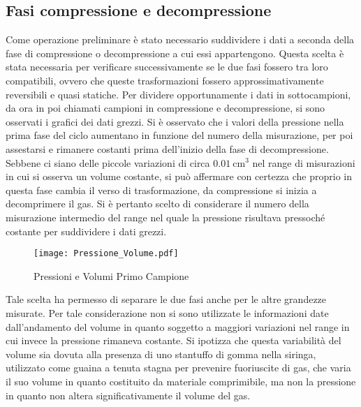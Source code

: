 \documentclass[a4paper,11pt,oneside]{article}
\begin{document}
\subsection{Fasi compressione e decompressione}\label{par:compress}
Come operazione preliminare è stato necessario suddividere i dati a seconda della fase di compressione o decompressione a cui essi appartengono. Questa scelta è stata necessaria per verificare successivamente se le due fasi fossero tra loro compatibili, ovvero che queste trasformazioni fossero approssimativamente reversibili e quasi statiche.
Per dividere opportunamente i dati in sottocampioni, da ora in poi chiamati campioni in compressione e decompressione, si sono osservati i grafici dei dati grezzi. Si è osservato che i valori della pressione nella prima fase del ciclo aumentano in funzione del numero della misurazione, per poi assestarsi e rimanere costanti prima dell'inizio della fase di decompressione. Sebbene ci siano delle piccole variazioni di circa $\SI{0.01}{\centi\meter\cubed}$ nel range di misurazioni in cui si osserva un volume costante, si può affermare con certezza che proprio in questa fase cambia il verso di trasformazione, da compressione si inizia a decomprimere il gas. Si è pertanto scelto di considerare il numero della misurazione intermedio del range nel quale la pressione risultava pressoché costante per suddividere i dati grezzi.
\begin{wrapfigure}{l}{0.5\textwidth}
  \begin{center}
    \texttt{[image: Pressione\_Volume.pdf]}
  \end{center}
  \caption{Pressioni e Volumi Primo Campione}
  \label{fig:campione2}
\end{wrapfigure}
Tale scelta ha permesso di separare le due fasi anche per le altre grandezze misurate. Per tale considerazione non si sono utilizzate le informazioni date dall'andamento del volume in quanto soggetto a maggiori variazioni nel range in cui invece la pressione rimaneva costante. Si ipotizza che questa variabilità del volume sia dovuta alla presenza di uno stantuffo di gomma nella siringa, utilizzato come guaina a tenuta stagna per prevenire fuoriuscite di gas, che varia il suo volume in quanto costituito da materiale comprimibile, ma non la pressione in quanto non altera significativamente il volume del gas.

\end{document}
